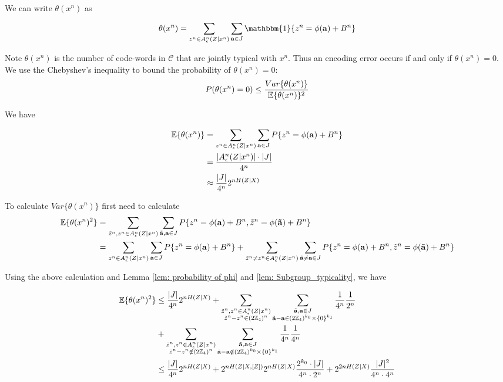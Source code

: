 \documentclass[conference]{IEEEtran}
\theoremstyle{plain}
\theoremstyle{definition}
\theoremstyle{remark}
\begin{document}
 We can write $\theta(x^n)$ as

\begin{equation*}
 \theta(x^n)=\sum_{z^n \in A_{\epsilon}^n(Z|x^n)}\sum_{\mathbf{a}\in J}\mathbbm{1}\{z^n = \phi(\mathbf{a})+B^n\}
\end{equation*}

Note $\theta(x^n)$ is the number of code-words in $\mathcal{C}$ that are jointly typical with $x^n$. Thus an encoding error occurs if and only if $\theta(x^n)=0$. We use the Chebyshev's inequality to bound the probability of $\theta(x^n)=0$:
\begin{equation*}
P(\theta(x^n)=0)\leq \frac{Var\{\theta(x^n)\}}{\mathbb{E}\{\theta(x^n)\}^2}
\end{equation*}

We have

\begin{align*}
\mathbb{E}\{\theta(x^n)\}&= \sum_{z^n \in A_{\epsilon}^n(Z|x^n)}\sum_{\mathbf{a}\in J}P\{z^n = \phi(\mathbf{a})+B^n\}\\
&=\frac{|A_{\epsilon}^n(Z|x^n)|\cdot |J|}{4^n}\\
&\approx \frac{|J|}{4^n}2^{nH(Z|X)}
\end{align*}


To calculate $Var\{\theta(x^n)\}$ first need to calculate
\begin{align*}
\mathbb{E}\{\theta(x^n)^2\}&= \sum_{\tilde{z}^n, z^n \in A_{\epsilon}^n(Z|x^n)}\sum_{\tilde{\mathbf{a}}, \mathbf{a}\in J}P\{z^n = \phi(\mathbf{a})+B^n,\tilde{z}^n = \phi(\mathbf{\tilde{a}})+B^n\}\\
&= \sum_{z^n \in A_{\epsilon}^n(Z|x^n)}\sum_{\mathbf{a}\in J}P\{z^n = \phi(\mathbf{a})+B^n\}+\sum_{\tilde{z}^n \neq z^n \in A_{\epsilon}^n(Z|x^n)}\sum_{\tilde{\mathbf{a}} \neq \mathbf{a}\in J}P\{z^n = \phi(\mathbf{a})+B^n,\tilde{z}^n = \phi(\mathbf{\tilde{a}})+B^n\}
\end{align*}

Using the above calculation and Lemma \ref{lem: probability of phi} and \ref{lem: Subgroup_typicality}, we have

\begin{align*}
\mathbb{E}\{\theta(x^n)^2\} &\leq \frac{|J|}{4^n}2^{nH(Z|X)} + \sum_{\substack{ \tilde{z}^n , z^n \in A_{\epsilon}^n(Z|x^n)\\ \tilde{z}^n-z^n \in (2\mathbb{Z}_4)^n}}\sum_{\substack{ \tilde{\mathbf{a}}, \mathbf{a} \in J \\ \tilde{\mathbf{a}}-\mathbf{a} \in (2\mathbb{Z}_4)^{k_0} \times \{0\}^{k_1}}} \frac{1}{4^n}\frac{1}{2^n}\\
&+\sum_{\substack{ \tilde{z}^n , z^n \in A_{\epsilon}^n(Z|x^n)\\ \tilde{z}^n-z^n \notin (2\mathbb{Z}_4)^n}}\sum_{\substack{ \tilde{\mathbf{a}}, \mathbf{a}\in J \\ \tilde{\mathbf{a}}-\mathbf{a} \notin (2\mathbb{Z}_4)^{k_0} \times \{0\}^{k_1}}} \frac{1}{4^n}\frac{1}{4^n}\\
&\leq \frac{|J|}{4^n}2^{nH(Z|X)}+2^{nH(Z|X,[Z])}2^{nH(Z|X)} \frac{2^{k_0} \cdot |J|}{4^n \cdot 2^n}+2^{2nH(Z|X)} \frac{|J|^2}{4^n \cdot 4^n}
\end{align*}
\end{document}
